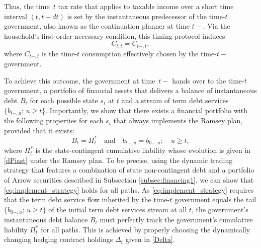 \documentclass[12pt]{article}
\begin{document}
\noindent Thus,  the time~$t$ tax rate  that applies to taxable income  over a short time interval $(t, t+dt)$ is set by the instantaneous predecessor of the time-$t$ government, also known as the continuation  planner at time $t-$. Via  the household's first-order necessary condition, this timing protocol induces
\begin{equation}\label{eq:Ctt}
C_{t,t} = C_{t-,t},
\end{equation}
where $C_{t-,t}$ is the time-$t$ consumption effectively chosen by the time-$t-$ government.

To achieve this outcome,  the government at time~$t-$ hands over  to the time-$t$ government, a portfolio of financial assets that delivers a balance of  instantaneous debt  $B_t$ for each possible state $s_t$ at $t$  and a stream of term debt services $\{b_{t-,u};\, u \ge t\}$. Importantly,  %
we show that there exists a financial portfolio  with the  following properties for  each  $s_t$ that always implements the Ramsey plan, provided that it exists: %
\begin{equation}\label{eq:implement_strategy}
B_t = \Pi_t^* \quad \text{and} \quad b_{t-,u} = b_{0-,u};\quad u \ge t , 
\end{equation}
where $ \Pi_t^*$ is the state-contingent cumulative liability whose evolution is given in \eqref{dPiast} under the Ramsey plan. To be precise, using the  dynamic trading strategy that features a combination of state non-contingent debt and a portfolio of Arrow securities described in Subsection \ref{subsec:financing1}, we can show that \eqref{eq:implement_strategy} holds for all paths. %
As \eqref{eq:implement_strategy} requires that the term debt service flow inherited by the time-$t$ government equals  the tail  $\{b_{0-,u};\, u \ge t\}$ of the initial term debt services stream at all $t$, %
the government's instantaneous debt balance $B_t$ must perfectly track the government's cumulative liability $\Pi_t^\ast$ for all paths. This is achieved by properly choosing the dynamically changing hedging contract holdings $\Delta_{t}$ given in \eqref{Delta}. 

\end{document}
